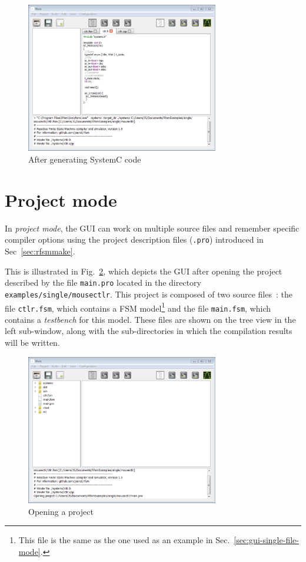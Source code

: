 \begin{figure}[h]
  \centering
  \includegraphics[width=0.75\textwidth]{figs/gui/make-systemc}
  \caption{After generating SystemC code}
  \label{fig:make-systemc}
\end{figure}

\section{Project mode}
\label{sec:gui-project-mode}

In \emph{project mode}, the GUI can work on multiple source files and remember specific compiler
options using the project description files (\verb|.pro|) introduced in Sec~\ref{sec:rfsmmake}.

This is illustrated in Fig.~\ref{fig:open-project}, which depicts the GUI after opening the project
described by the file \verb|main.pro| located in the directory \texttt{examples/single/mousectlr}.
This project is composed of two source files~: the file \verb|ctlr.fsm|, which contains a FSM
model\footnote{This file is the same as the one used as an example in
  Sec.~\ref{sec:gui-single-file-mode}.} and the file \verb|main.fsm|, which contains a
\emph{testbench} for this model. These files are shown on the tree view in the left sub-window,
along with the sub-directories in which the compilation results will be written. 

\begin{figure}[h]
  \centering
  \includegraphics[width=0.75\textwidth]{figs/gui/open-project}
  \caption{Opening a project}
  \label{fig:open-project}
\end{figure}


